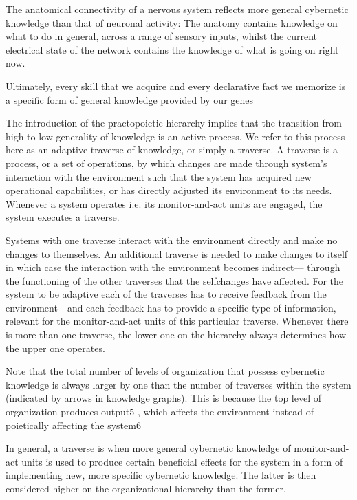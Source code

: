 \documentclass[10pt,a4paper]{article}
\begin{document}
The anatomical connectivity of a nervous system
reflects more general cybernetic knowledge than that of neuronal
activity: The anatomy contains knowledge on what to do in general,
across a range of sensory inputs, whilst the current electrical state of
the network contains the knowledge of what is going on right now.

 Ultimately, every
skill that we acquire and every declarative fact we memorize is a specific
form of general knowledge provided by our genes 



The introduction of the practopoietic hierarchy implies that the
transition from high to low generality of knowledge is an active
process. We refer to this process here as an adaptive traverse of
knowledge, or simply a traverse. A traverse is a process, or a set of
operations, by which changes are made through system’s interaction
with the environment such that the system has acquired new
operational capabilities, or has directly adjusted its environment to
its needs. Whenever a system operates i.e. its monitor-and-act
units are engaged, the system executes a traverse.

Systems with one traverse interact with
the environment directly and make no changes to themselves. An
additional traverse is needed to make changes to itself in which
case the interaction with the environment becomes indirect—
through the functioning of the other traverses that the selfchanges
have affected. For the system to be adaptive each of the
traverses has to receive feedback from the environment—and each
feedback has to provide a specific type of information, relevant for
the monitor-and-act units of this particular traverse. Whenever
there is more than one traverse, the lower one on the hierarchy
always determines how the upper one operates. 


Note that the total
number of levels of organization that possess cybernetic knowledge
is always larger by one than the number of traverses within
the system (indicated by arrows in knowledge graphs). This is
because the top level of organization produces output5
, which
affects the environment instead of poietically affecting the
system6



In general, a traverse is when more general cybernetic knowledge
of monitor-and-act units is used to produce certain beneficial
effects for the system in a form of implementing new, more
specific cybernetic knowledge. The latter is then considered higher
on the organizational hierarchy than the former.
\end{document}
